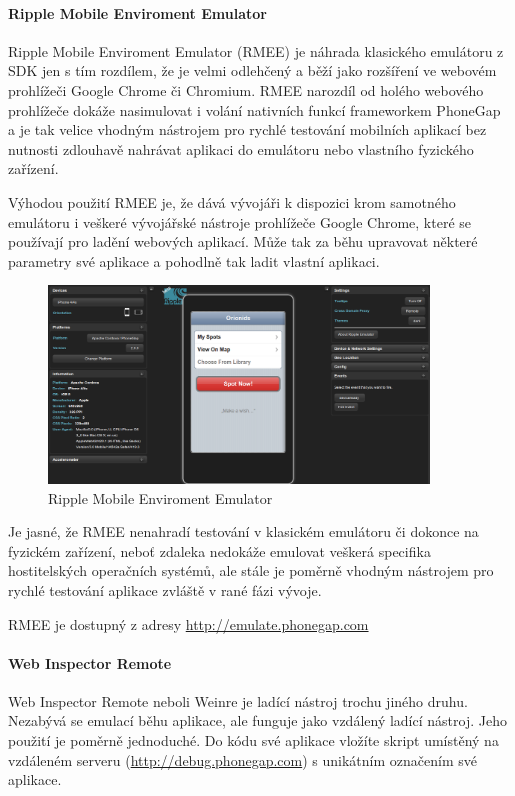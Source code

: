 \paragraph{Ripple Mobile Enviroment Emulator}
Ripple Mobile Enviroment Emulator (RMEE) je náhrada klasického emulátoru z SDK jen s tím rozdílem, že je velmi odlehčený a běží jako rozšíření ve webovém prohlížeči Google Chrome či Chromium. RMEE narozdíl od holého webového prohlížeče dokáže nasimulovat i volání nativních funkcí frameworkem PhoneGap a je tak velice vhodným nástrojem pro rychlé testování mobilních aplikací bez nutnosti zdlouhavě nahrávat aplikaci do emulátoru nebo vlastního fyzického zařízení.

Výhodou použití RMEE je, že dává vývojáři k dispozici krom samotného emulátoru i veškeré vývojářské nástroje prohlížeče Google Chrome, které se používají pro ladění webových aplikací. Může tak za běhu upravovat některé parametry své aplikace a pohodlně tak ladit vlastní aplikaci.

\begin{figure}\centering
\includegraphics[width=0.9\textwidth]{RMEE.png}
\caption{Ripple Mobile Enviroment Emulator}
\label{fig:RMEE}
\end{figure} 

Je jasné, že RMEE nenahradí testování v klasickém emulátoru či dokonce na fyzickém zařízení, neboť zdaleka nedokáže emulovat veškerá specifika hostitelských operačních systémů, ale stále je poměrně vhodným nástrojem pro rychlé testování aplikace zvláště v rané fázi vývoje.

RMEE je dostupný z adresy \url{http://emulate.phonegap.com}

\paragraph{Web Inspector Remote}
Web Inspector Remote neboli Weinre je ladící nástroj trochu jiného druhu. Nezabývá se emulací běhu aplikace, ale funguje jako vzdálený ladící nástroj. Jeho použití je poměrně jednoduché. Do kódu své aplikace vložíte skript umístěný na vzdáleném serveru (\url{http://debug.phonegap.com}) s unikátním označením své aplikace.

